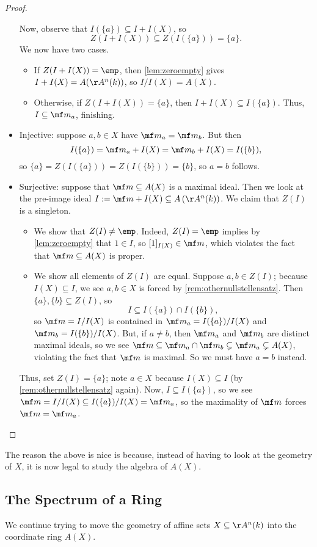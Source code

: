 \begin{proof}
\begin{itemize}
		Now, observe that $I(\{a\})\subseteq I+I(X)$, so
		\[Z(I+I(X))\subseteq Z(I(\{a\}))=\{a\}.\]
		We now have two cases.
		\begin{itemize}
			\item If $Z(I+I(X))=\emp$, then \autoref{lem:zeroempty} gives $I+I(X)=A(\AA^n(k))$, so $I/I(X)=A(X)$.
			\item Otherwise, if $Z(I+I(X))=\{a\}$, then $I+I(X)\subseteq I(\{a\})$. Thus, $I\subseteq\mf m_a$, finishing.
		\end{itemize}
		\item Injective: suppose $a,b\in X$ have $\mf m_a=\mf m_b$. But then
		\[I(\{a\})=\mf m_a+I(X)=\mf m_b+I(X)=I(\{b\}),\]
		so $\{a\}=Z(I(\{a\}))=Z(I(\{b\}))=\{b\}$, so $a=b$ follows.
		\item Surjective: suppose that $\mf m\subseteq A(X)$ is a maximal ideal. Then we look at the pre-image ideal $I:=\mf m+I(X)\subseteq A\left(\AA^n(k)\right)$. We claim that $Z(I)$ is a singleton.
		\begin{itemize}
			\item We show that $Z(I)\ne\emp$. Indeed, $Z(I)=\emp$ implies by \autoref{lem:zeroempty} that $1\in I$, so $[1]_{I(X)}\in\mf m$, which violates the fact that $\mf m\subseteq A(X)$ is proper.
			\item We show all elements of $Z(I)$ are equal. Suppose $a,b\in Z(I)$; because $I(X)\subseteq I$, we see $a,b\in X$ is forced by \autoref{rem:othernullstellensatz}. Then $\{a\},\{b\}\subseteq Z(I)$, so
			\[I\subseteq I(\{a\})\cap I(\{b\}),\]
			so $\mf m=I/I(X)$ is contained in $\mf m_a=I(\{a\})/I(X)$ and $\mf m_b=I(\{b\})/I(X)$. But, if $a\ne b$, then $\mf m_a$ and $\mf m_b$ are distinct maximal ideals, so we see $\mf m\subseteq\mf m_a\cap\mf m_b\subsetneq\mf m_a\subsetneq A(X)$, violating the fact that $\mf m$ is maximal. So we must have $a=b$ instead.
		\end{itemize}
		Thus, set $Z(I)=\{a\}$; note $a\in X$ because $I(X)\subseteq I$ (by \autoref{rem:othernullstellensatz} again). Now, $I\subseteq I(\{a\})$, so we see $\mf m=I/I(X)\subseteq I(\{a\})/I(X)=\mf m_a$, so the maximality of $\mf m$ forces $\mf m=\mf m_a$.
		\qedhere
	\end{itemize}
\end{proof}
The reason the above is nice is because, instead of having to look at the geometry of $X$, it is now legal to study the algebra of $A(X)$.

\subsection{The Spectrum of a Ring}
We continue trying to move the geometry of affine sets $X\subseteq\AA^n(k)$ into the coordinate ring $A(X)$.

